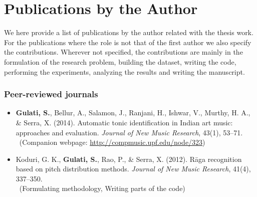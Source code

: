 \newcommand\contrib[1]{\\~{\footnotesize (#1)}}
% 
\newcommand\resource[2]{
	\noindent #1 \par
	\vspace{0.2em}
	{\centering	\url{#2} \par}
	\vspace{0.5em}
	\hrule \par 
	\vspace{0.8em} \par}
%
%
\chapter[Publications by the Author][Publications by the Author]{Publications by the Author}
\label{app:mypapers}%

We here provide a list of publications by the author related with the thesis work. For the publications where the role is not that of the first author we  also specify the contributions. Wherever not specified, the contributions are mainly in the formulation of the research problem, building the dataset, writing the code, performing the experiments, analyzing the results and writing the manuscript.

\subsection*{Peer-reviewed journals}
\begin{itemize}[leftmargin=*]
	\item \textbf{Gulati, S.}, Bellur, A., Salamon, J., Ranjani, H., Ishwar, V., Murthy, H. A., \& Serra, X. (2014). Automatic tonic identification in Indian art music: approaches and evaluation. \textit{Journal of New Music Research}, 43(1), 53–71.
	\contrib{Companion webpage: \url{http://compmusic.upf.edu/node/323}}
	\item Koduri, G. K., \textbf{Gulati, S.}, Rao, P., \& Serra, X. (2012). R\={a}ga recognition based on pitch distribution methods. \textit{Journal of New Music Research}, 41(4), 337–350.
	\contrib{Formulating methodology, Writing parts of the code}
	
\end{itemize}
%
